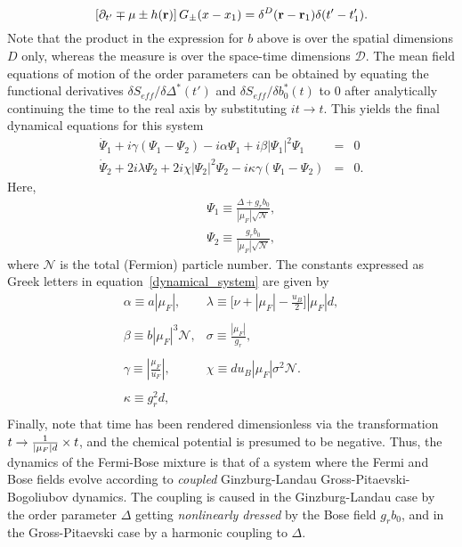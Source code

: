 \documentclass[a4paper,10pt]{article}
\begin{document}
\begin{equation}
\label{greens:function}
 \left[ \partial_{t'} \mp \mu \pm h({\bf r}) \right] G_\pm(x-x_1) = \delta^D({\bf r}-{\bf r}_1) \delta(t'-t'_1).
\end{equation}
Note that the product in the expression for $b$ above is over the spatial dimensions $D$ only, whereas the measure is over the space-time dimensions $\mathcal{D}$. The mean field equations of motion of the order parameters can be obtained by equating the functional derivatives $\delta S_{eff}/\delta\Delta^*(t')$ and   $\delta S_{eff}/{\delta b^*_0(t)}$ to $0$ after analytically continuing the time to the real axis by substituting $it \rightarrow t$. This yields the final dynamical equations for this system
\begin{eqnarray}
\label{dynamical_system}
\dot \Psi_1 + i\gamma \left( \Psi_1-\Psi_2 \right) - i\alpha \Psi_1 +i\beta |\Psi_1|^2 \Psi_1 &=& 0 \nonumber \\
\dot \Psi_2 +2 i \lambda \Psi_2 +2 i\chi|\Psi_2|^2\Psi_2 - i\kappa\gamma \left(\Psi_1-\Psi_2 \right) &=& 0.
\end{eqnarray}
Here,
\begin{eqnarray}
\label{vartrans}
&&{\Psi}_1 \equiv \frac{\Delta + g_rb_0}{|\mu_F|\sqrt{\mathcal N}}, \nonumber \\
&&{\Psi}_2 \equiv \frac{g_rb_0}{|\mu_F|\sqrt{\mathcal N}},
\end{eqnarray}
where $\mathcal{N}$ is the total (Fermion) particle number. The constants expressed as Greek letters in equation~\ref{dynamical_system} are given by
\begin{equation}
\label{greek_consts}
\begin{array}{ll}
 \alpha\equiv  a|\mu_F|,		&\lambda \equiv \bigg[\nu+|\mu_F|-\frac{u_B}{2} \bigg]|\mu_F|d,  \\
					&					  			 \\
\beta\equiv  b|\mu_F|^3{\mathcal N},    &\sigma \equiv   \frac{|\mu_F|}{g_r},			  	 \\
					&					  			 \\
\gamma\equiv  |\frac{\mu_F}{u_F}|, 	&\chi\equiv  d u_B|\mu_F|\sigma^2{\mathcal N}.			 \\
					&					  			 \\
\kappa  \equiv  g^2_rd,  		& 						  		 \\
\end{array}
\end{equation}
Finally, note that time has been rendered dimensionless via the transformation $t\rightarrow{1\over |\mu_F|d}\times t$, and the chemical potential is presumed to be negative. Thus, the dynamics of the Fermi-Bose mixture is that of a system where the Fermi and Bose fields evolve according to \textit{coupled} Ginzburg-Landau Gross-Pitaevski-Bogoliubov dynamics. The coupling is caused in the Ginzburg-Landau case by the order parameter $\Delta$ getting \textit{nonlinearly dressed} by the Bose field $g_rb_0$, and in the Gross-Pitaevski case by a harmonic coupling to $\Delta$.
\end{document}
